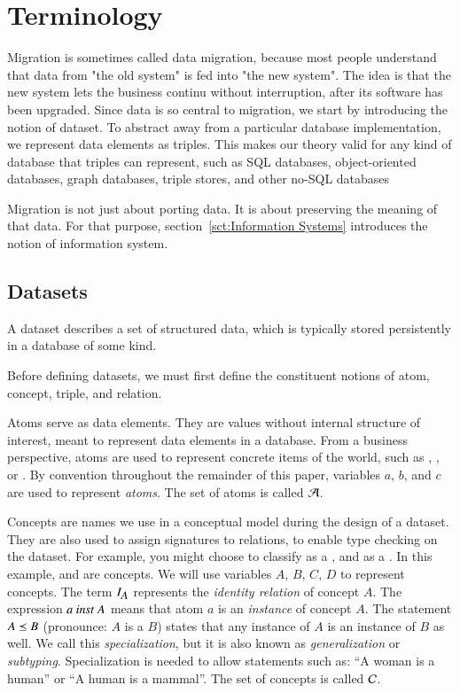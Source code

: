 \documentclass{elsarticle}
\begin{document}
\section{Terminology}
\label{sct:Terminology}
	Migration is sometimes called data migration, because most people understand that data from "the old system" is fed into "the new system".
	The idea is that the new system lets the business continu without interruption, after its software has been upgraded.
	Since data is so central to migration, we start by introducing the notion of dataset.
	To abstract away from a particular database implementation,
	we represent data elements as triples.
	This makes our theory valid for any kind of database that triples can represent,
	such as SQL databases, object-oriented databases, graph databases, triple stores, and other no-SQL databases

	Migration is not just about porting data.
	It is about preserving the meaning of that data.
	For that purpose, section~\ref{sct:Information Systems} introduces the notion of information system.

\subsection{Datasets}
	A dataset describes a set of structured data, which is typically stored persistently in a database of some kind.

	Before defining datasets, we must first define the constituent notions of atom, concept, triple, and relation.
	
	Atoms serve as data elements.
	They are values without internal structure of interest, meant to represent data elements in a database.
	From a business perspective, atoms are used to represent concrete items of the world,
	such as , , or .
	By convention throughout the remainder of this paper, variables $a$, $b$, and $c$ are used to represent \emph{atoms}.
	The set of atoms is called $\mathcal{A}$.
	

	Concepts are names we use in a conceptual model during the design of a dataset.
	They are also used to assign signatures to relations, to enable type checking on the dataset.
	For example, you might choose to classify  as a , and  as a .
	In this example,  and  are concepts.
    We will use variables $A$, $B$, $C$, $D$ to represent concepts.
	The term $I_{\text{\it \small A\/}}$ represents the \emph{identity relation} of concept $A$.
	The expression $a\ \text{\it inst\/}\ A$ means that atom $a$ is an \emph{instance} of concept $A$.
	The statement $A\preceq B$ (pronounce: $A$ is a $B$) states that any instance of $A$ is an instance of $B$ as well.
	We call this {\em specialization}, but it is also known as {\em generalization} or {\em subtyping}.
	Specialization is needed to allow statements such as: ``A woman is a human'' or ``A human is a mammal''.
	The set of concepts is called $\mathcal{C}$.
	
\end{document}
